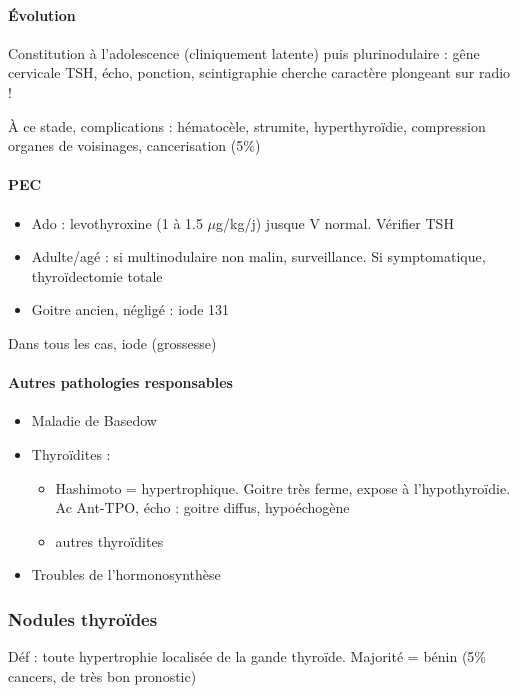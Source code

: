 \documentclass[11pt]{article}
\begin{document}
\paragraph{Évolution}
\label{sec:orgb135ff8}
Constitution à l'adolescence (cliniquement latente) puis plurinodulaire : gêne
cervicale \thus TSH, écho, ponction, scintigraphie
\danger cherche caractère plongeant sur radio !

À ce stade, complications : hématocèle, strumite, hyperthyroïdie, compression
organes de voisinages, cancerisation (5\%)

\paragraph{PEC}
\label{sec:orgb68c6e9}
\begin{itemize}
\item Ado : levothyroxine (1 à 1.5 \(\mu\)g/kg/j) jusque V normal. Vérifier TSH
\item Adulte/agé : si multinodulaire non malin, surveillance. Si symptomatique,
thyroïdectomie totale
\item Goitre ancien, négligé : iode 131
\end{itemize}
Dans tous les cas, \inc iode (grossesse)

\paragraph{Autres pathologies responsables}
\label{sec:org0ea4ece}
\begin{itemize}
\item Maladie de Basedow
\item Thyroïdites : 
\begin{itemize}
\item Hashimoto = hypertrophique. Goitre très ferme, expose à l'hypothyroïdie. Ac Ant-TPO\inc\inc{}, écho : goitre diffus, hypoéchogène
\item autres thyroïdites
\end{itemize}
\item Troubles de l'hormonosynthèse
\end{itemize}

\subsubsection{Nodules thyroïdes}
\label{sec:org9111882}
Déf : toute hypertrophie localisée de la gande thyroïde. Majorité = bénin (5\%
cancers, de très bon pronostic)
\end{document}
